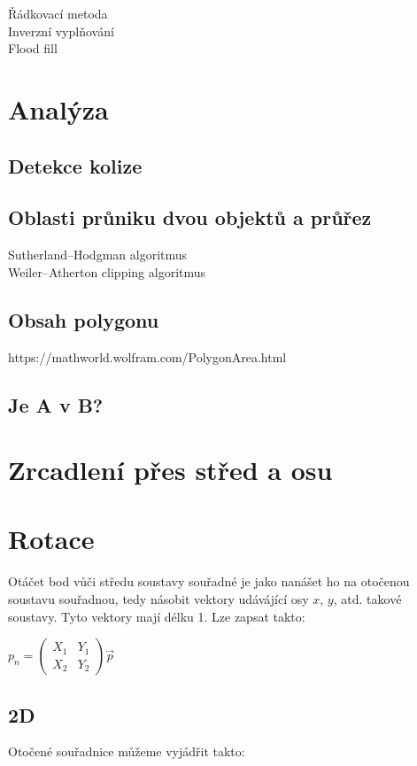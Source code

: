 \documentclass[a4paper,12pt]{book}
\begin{document}
Řádkovací metoda
\\Inverzní vyplňování
\\Flood fill


\chapter{Analýza}
\section{Detekce kolize}
\section{Oblasti průniku dvou objektů a průřez}
Sutherland–Hodgman algoritmus
\\Weiler–Atherton clipping algoritmus

\section{Obsah polygonu}
https://mathworld.wolfram.com/PolygonArea.html
\section{Je A v B?}




\chapter{Zrcadlení přes střed a osu}


\chapter{Rotace}


Otáčet bod vůči středu soustavy souřadné je jako nanášet ho na otočenou soustavu souřadnou, tedy násobit vektory udávájící osy $x$, $y$, atd. takové soustavy.
Tyto vektory mají délku 1. Lze zapsat takto:

$p_n = \begin{pmatrix}
X_1 & Y_1 \\
X_2 & Y_2
\end{pmatrix}\vec{p}$\\


\section{2D}

Otočené souřadnice můžeme vyjádřit takto:
\end{document}

